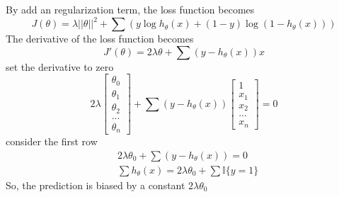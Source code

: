 \begin{answer}
By add an regularization term, the loss function becomes $$J(\theta) = \lambda||\theta||^2 + \sum (y\log h_\theta(x)+(1-y)\log(1-h_\theta(x)))$$
The derivative of the loss function becomes $$J'(\theta) = 2\lambda\theta + \sum(y - h_\theta(x))x $$
set the derivative to zero
$$2\lambda \begin{bmatrix}\theta_0\\ \theta_1\\ \theta_2\\ ...\\ \theta_n\end{bmatrix} + \sum(y - h_\theta(x))\begin{bmatrix}1\\ x_1\\ x_2\\ ...\\ x_n\end{bmatrix} = 0$$
consider the first row
\begin{align*}
    &2\lambda\theta_0 + \sum(y - h_\theta(x)) = 0\\
    &\sum h_\theta(x) = 2\lambda\theta_0 + \sum \mathbb{I}\{y = 1\}
\end{align*}
So, the prediction is biased by a constant $2\lambda\theta_0$
\end{answer}
